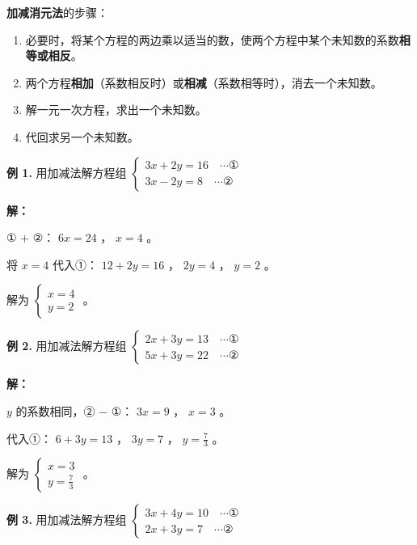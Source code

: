 \begin{understand}


\textbf{加减消元法}的步骤：

\begin{enumerate}
  \item 必要时，将某个方程的两边乘以适当的数，使两个方程中某个未知数的系数\textbf{相等或相反}。
  \item 两个方程\textbf{相加}（系数相反时）或\textbf{相减}（系数相等时），消去一个未知数。
  \item 解一元一次方程，求出一个未知数。
  \item 代回求另一个未知数。
\end{enumerate}


\end{understand}

\begin{workedexamples}


\textbf{例 1.} 用加减法解方程组 $\begin{cases} 3x + 2y = 16 \quad \cdots ① \\ 3x - 2y = 8 \quad \cdots ② \end{cases}$

\textbf{解：}

① $+$ ②： $6x = 24$ ， $x = 4$ 。

将 $x = 4$ 代入①： $12 + 2y = 16$ ， $2y = 4$ ， $y = 2$ 。

解为 $\begin{cases} x = 4 \\ y = 2 \end{cases}$ 。

\textbf{例 2.} 用加减法解方程组 $\begin{cases} 2x + 3y = 13 \quad \cdots ① \\ 5x + 3y = 22 \quad \cdots ② \end{cases}$

\textbf{解：}

$y$ 的系数相同，② $-$ ①： $3x = 9$ ， $x = 3$ 。

代入①： $6 + 3y = 13$ ， $3y = 7$ ， $y = \frac{7}{3}$ 。

解为 $\begin{cases} x = 3 \\ y = \frac{7}{3} \end{cases}$ 。

\textbf{例 3.} 用加减法解方程组 $\begin{cases} 3x + 4y = 10 \quad \cdots ① \\ 2x + 3y = 7 \quad \cdots ② \end{cases}$


\end{workedexamples}
